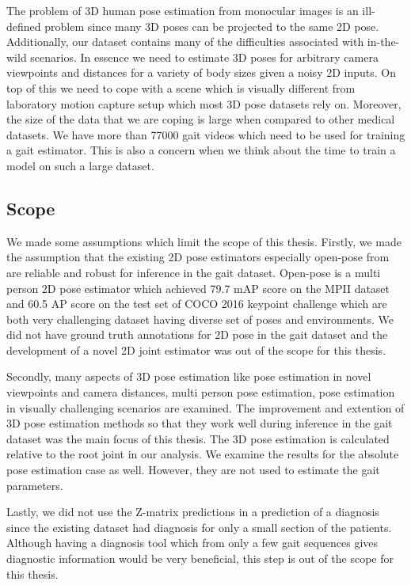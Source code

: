 The problem of 3D human pose estimation from monocular images is an ill-defined problem since many 3D poses can be projected to the same 2D pose. Additionally, our dataset contains many of the difficulties associated with in-the-wild scenarios. In essence we need to estimate 3D poses for arbitrary camera viewpoints and distances for a variety of body sizes given a noisy 2D inputs. On top of this we need to cope with a scene which is visually different from laboratory motion capture setup which most 3D pose datasets rely on. Moreover, the size of the data that we are coping is large when compared to other medical datasets. We have more than 77000 gait videos which need to be used for training a gait estimator. This is also a concern when we think about the time to train a model on such a large dataset.

\subsection{Scope}

We made some assumptions which limit the scope of this thesis. Firstly, we made the assumption that the existing 2D pose estimators especially open-pose from \parencite{cao2016realtime} are reliable and robust for inference in the gait dataset. Open-pose is a multi person 2D pose estimator which achieved 79.7 mAP score on the MPII dataset and 60.5 AP score on the test set of COCO 2016 keypoint challenge which are both very challenging dataset having diverse set of poses and environments. We did not have ground truth annotations for 2D pose in the gait dataset and the development of a novel 2D joint estimator was out of the scope for this thesis.

Secondly, many aspects of 3D pose estimation like pose estimation in novel viewpoints and camera distances, multi person pose estimation, pose estimation in visually challenging scenarios are examined. The improvement and extention of 3D pose estimation methods so that they work well during inference in the gait dataset was the main focus of this thesis. The 3D pose estimation is calculated relative to the root joint in our analysis. We examine the results for the absolute pose estimation case as well. However, they are not used to estimate the gait parameters.

Lastly, we did not use the Z-matrix predictions in a prediction of a diagnosis since the existing dataset had diagnosis for only a small section of the patients. Although having a diagnosis tool which from only a few gait sequences gives diagnostic information would be very beneficial, this step is out of the scope for this thesis.


